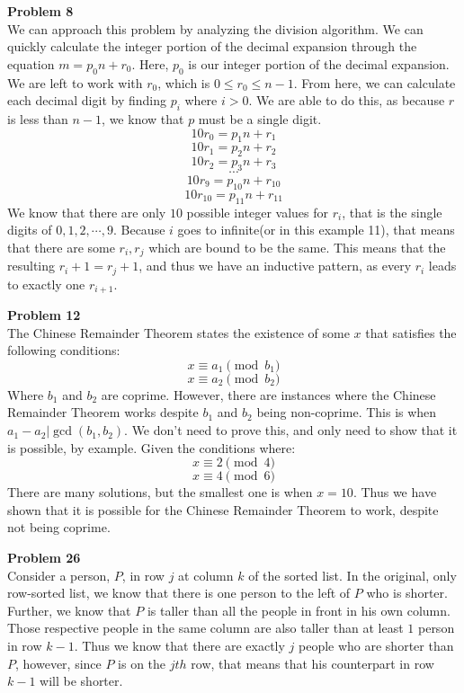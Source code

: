 \documentclass[12pt]{article}
\begin{document}
\noindent
\textbf{Problem 8}\\
We can approach this problem by analyzing the division algorithm. We can quickly calculate the 
integer portion of the decimal expansion through the equation $m = p_{0}n + r_{0}$. Here, $p_0$
is our integer portion of the decimal expansion. We are left to work with $r_0$, which is 
$0 \le r_0 \le n-1$. From here, we can calculate each decimal digit by finding $p_i$ where $i > 0$.
	We are able to do this, as because $r$ is less than $n-1$, we know that $p$ must be a single digit.
$$10r_{0} = p_{1}n + r_{1}$$
$$10r_1 = p_{2}n + r_{2}$$
$$10r_2 = p_{3}n + r_3$$
$$\cdots$$
$$10r_9 = p_{10}n + r_{10}$$
$$10r_{10} = p_{11}n + r_{11}$$
We know that there are only $10$ possible integer values for $r_i$, that is the single digits of
$0, 1, 2, \cdots, 9$. Because $i$ goes to infinite(or in this example 11), that means that there are some $r_i, r_j$
which are bound to be the same. This means that the resulting $r_i+1 = r_j+1$, and thus we have an inductive pattern, as
every $r_i$ leads to exactly one $r_{i+1}$.

\noindent 
\textbf{Problem 12} \\
The Chinese Remainder Theorem states the existence of some $x$ that satisfies the following conditions:
$$x \equiv a_1 \pmod{b_1}$$
$$x \equiv a_2 \pmod{b_2}$$
Where $b_1$ and $b_2$ are coprime. However, there are instances where the Chinese Remainder Theorem works despite $b_1$
and $b_2$ being non-coprime. This is when $a_1 - a_2|\gcd{(b_1, b_2)}$. We don't need to prove this, and only need
to show that it is possible, by example. Given the conditions where:
$$x \equiv 2 \pmod{4}$$
$$x \equiv 4 \pmod{6}$$
There are many solutions, but the smallest one is when $x = 10$. Thus we have shown that it is possible
for the Chinese Remainder Theorem to work, despite not being coprime.

\noindent
\textbf{Problem 26}\\
Consider a person, $P$, in row $j$ at column $k$ of the sorted list. In the original, only row-sorted list, 
we know that there is one person to the left of $P$ who is shorter. Further, we know that $P$ is taller than all the people in front
in his own column. Those respective people in the same column are also taller than at least $1$ person in row $k-1$. Thus we know that there
are exactly $j$ people who are shorter than $P$, however, since $P$ is on the $jth$ row, that means that his counterpart in row $k-1$ will be 
shorter.
\end{document}
